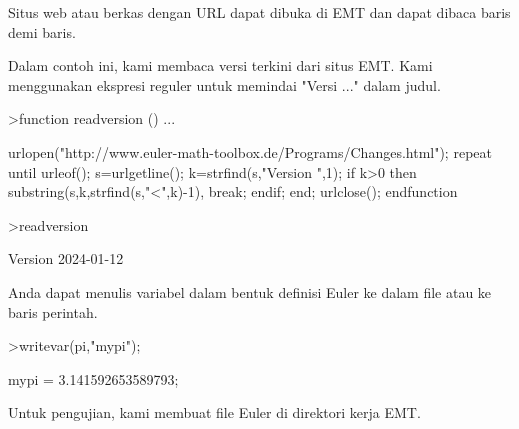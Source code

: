 \documentclass[a4paper,10pt]{article}
\begin{document}
\begin{eulernotebook}
\begin{eulercomment}
\begin{eulercomment}
\begin{eulercomment}
\begin{eulercomment}
\begin{eulercomment}
\begin{eulercomment}
\begin{eulercomment}
\begin{eulercomment}
\begin{eulercomment}
\begin{eulercomment}
\begin{eulercomment}
\begin{eulercomment}
\begin{eulercomment}
\begin{eulercomment}
\begin{eulercomment}
\begin{eulercomment}
\begin{eulercomment}
\begin{eulercomment}
\begin{eulercomment}
\begin{eulercomment}
\begin{eulercomment}
\begin{eulercomment}
\begin{eulercomment}
\begin{eulercomment}
\begin{eulercomment}
\begin{eulercomment}
\begin{eulercomment}
\begin{eulercomment}
\begin{eulercomment}
\begin{eulercomment}
\begin{eulercomment}
\begin{eulercomment}
\begin{eulercomment}
\begin{eulercomment}
\begin{eulercomment}
\begin{eulercomment}
\begin{eulercomment}
Situs web atau berkas dengan URL dapat dibuka di EMT dan dapat dibaca
baris demi baris.

Dalam contoh ini, kami membaca versi terkini dari situs EMT. Kami
menggunakan ekspresi reguler untuk memindai "Versi ..." dalam judul.
\end{eulercomment}
\begin{eulerprompt}
>function readversion () ...
\end{eulerprompt}
\begin{eulerudf}
  urlopen("http://www.euler-math-toolbox.de/Programs/Changes.html");
  repeat
    until urleof();
    s=urlgetline();
    k=strfind(s,"Version ",1);
    if k>0 then substring(s,k,strfind(s,"<",k)-1), break; endif;
  end;
  urlclose();
  endfunction
\end{eulerudf}
\begin{eulerprompt}
>readversion
\end{eulerprompt}
\begin{euleroutput}
  Version 2024-01-12
\end{euleroutput}
\begin{eulercomment}
Anda dapat menulis variabel dalam bentuk definisi Euler ke dalam file
atau ke baris perintah.
\end{eulercomment}
\begin{eulerprompt}
>writevar(pi,"mypi");
\end{eulerprompt}
\begin{euleroutput}
  mypi = 3.141592653589793;
\end{euleroutput}
\begin{eulercomment}
Untuk pengujian, kami membuat file Euler di direktori kerja EMT.
\end{eulercomment}

\end{eulercomment}
\end{eulercomment}
\end{eulercomment}
\end{eulercomment}
\end{eulercomment}
\end{eulercomment}
\end{eulercomment}
\end{eulercomment}
\end{eulercomment}
\end{eulercomment}
\end{eulercomment}
\end{eulercomment}
\end{eulercomment}
\end{eulercomment}
\end{eulercomment}
\end{eulercomment}
\end{eulercomment}
\end{eulercomment}
\end{eulercomment}
\end{eulercomment}
\end{eulercomment}
\end{eulercomment}
\end{eulercomment}
\end{eulercomment}
\end{eulercomment}
\end{eulercomment}
\end{eulercomment}
\end{eulercomment}
\end{eulercomment}
\end{eulercomment}
\end{eulercomment}
\end{eulercomment}
\end{eulercomment}
\end{eulercomment}
\end{eulercomment}
\end{eulercomment}
\end{eulernotebook}
\end{document}
